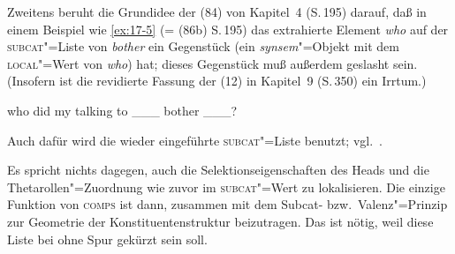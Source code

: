 \documentclass[output=paper]{LSP/langsci}
\begin{document}
\randnum\label{rn:17-29}Zweitens beruht die Grundidee der  (84) von Kapitel~4
(S.\,195) darauf, daß in einem Beispiel wie \eqref{ex:17-5} (= (86b) S.\,195) das
extrahierte Element \textit{who} auf der \textsc{subcat}"=Liste von \textit{bother} ein Gegenstück
(ein \textit{synsem}"=Objekt mit dem \textsc{local}"=Wert von \textit{who}) hat; dieses
Gegenstück muß außerdem geslasht sein. (Insofern ist die revidierte
Fassung der  (12) in Kapitel~9 (S.\,350) ein Irrtum.)
\begin{exe}
\ex
\label{ex:17-5}
who did my talking to \_\_\_ bother \_\_\_?
\end{exe}
Auch dafür wird die wieder eingeführte \textsc{subcat}"=Liste benutzt; vgl.\ \citet[380f. Anm.~39]{PollardSag1994}.

\randnum\label{rn:17-30}Es spricht nichts dagegen, auch die Selektionseigenschaften des Heads
und die Thetarollen"=Zuordnung wie zuvor im \textsc{subcat}"=Wert zu
lokalisieren. Die einzige Funktion von \textsc{comps} ist dann, zusammen mit
dem Subcat- bzw.\ Valenz"=Prinzip zur Geometrie der
Konstituentenstruktur beizutragen. Das ist nötig, weil diese Liste bei
 ohne Spur gekürzt sein soll.
\end{document}
